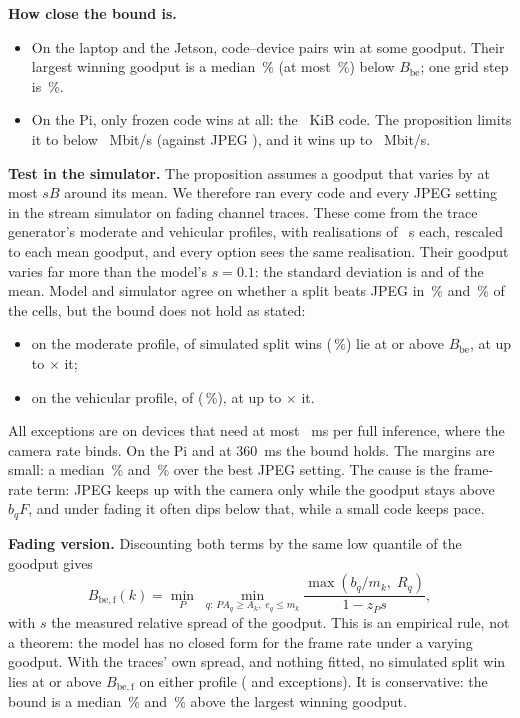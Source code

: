 \textbf{How close the bound is.}
\begin{itemize}
\item On the laptop and the Jetson, \BeTightFastN{} code--device pairs win at some goodput. Their largest winning
goodput is a median \BeTightFastMedian\,\% (at most \BeTightFastMax\,\%) below $B_{\mathrm{be}}$; one grid step is
\BeGridStepPct\,\%.
\item On the Pi, only \BePiWinCodesFrozen{} frozen code wins at all: the \BePiCodeKib~KiB code. The proposition limits
it to below \BePiBe~Mbit/s (against JPEG \BePiQstar), and it wins up to \BePiWin~Mbit/s.
\end{itemize}

\textbf{Test in the simulator.} The proposition assumes a goodput that varies by at most $sB$ around its mean. We
therefore ran every code and every JPEG setting in the stream simulator on fading channel traces. These come from the
trace generator's moderate and vehicular profiles, with \BeSimSeeds{} realisations of \BeSimDuration~s each, rescaled to
each mean goodput, and every option sees the same realisation. Their goodput varies far more than the model's $s = 0.1$:
the standard deviation is \BeSimModSpread{} and \BeSimVehSpread{} of the mean. Model and simulator agree on whether a
split beats JPEG in \BeSimModAgree\,\% and \BeSimVehAgree\,\% of the cells, but the bound does not hold as stated:
\begin{itemize}
\item on the moderate profile, \BeSimModExc{} of \BeSimModWins{} simulated split wins (\BeSimModExcPct\,\%) lie at or
above $B_{\mathrm{be}}$, at up to \BeSimModRatio{}$\times$ it;
\item on the vehicular profile, \BeSimVehExc{} of \BeSimVehWins{} (\BeSimVehExcPct\,\%), at up to
\BeSimVehRatio{}$\times$ it.
\end{itemize}
All exceptions are on devices that need at most \BeSimExcTfullMax~ms per full inference, where the camera rate binds.
On the Pi and at 360~ms the bound holds. The margins are small: a median \BeSimModMargin\,\% and \BeSimVehMargin\,\% over
the best JPEG setting. The cause is the frame-rate term: JPEG keeps up with the camera only while the goodput stays
above $b_q F$, and under fading it often dips below that, while a small code keeps pace.

\textbf{Fading version.} Discounting both terms by the same low quantile of the goodput gives
\[
B_{\mathrm{be,f}}(k) = \min_{P}\; \min_{q:\,P A_q \ge A_k,\; e_q \le m_k} \frac{\max(b_q/m_k,\; R_q)}{1 - z_P s},
\]
with $s$ the measured relative spread of the goodput. This is an empirical rule, not a theorem: the model has no
closed form for the frame rate under a varying goodput. With the traces' own spread, and nothing fitted, no simulated
split win lies at or above $B_{\mathrm{be,f}}$ on either profile (\BeSimModFadingExc{} and \BeSimVehFadingExc{}
exceptions). It is conservative: the bound is a median \BeSimModFadingSlack\,\% and \BeSimVehFadingSlack\,\% above the
largest winning goodput.

